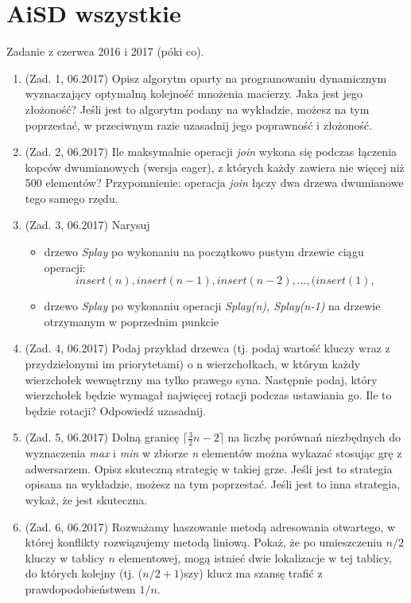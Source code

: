 \documentclass[10pt]{article}%
\begin{document}
\section*{AiSD wszystkie}
Zadanie z czerwca 2016 i 2017 (póki co).
\begin{enumerate}

\item (Zad. 1, 06.2017) Opisz algorytm oparty na programowaniu dynamicznym wyznaczający optymalną kolejność mnożenia macierzy. Jaka jest jego złożoność? Jeśli jest to algorytm podany na wykładzie, możesz na tym poprzestać, w przeciwnym razie uzasadnij jego poprawność i złożoność.

\item (Zad. 2, 06.2017) Ile maksymalnie operacji \textit{join} wykona się podczas łączenia kopców dwumianowych (wersja eager), z których każdy zawiera nie więcej niż 500 elementów? Przypomnienie: operacja \textit{join} łączy dwa drzewa dwumianowe tego samego rzędu.

\item (Zad. 3, 06.2017) Narysuj 
\begin{itemize}
\item drzewo \emph{Splay} po wykonaniu na początkowo pustym drzewie ciągu operacji:
 $$insert(n),insert(n-1),insert(n-2),...,(insert(1),$$
 \item drzewo \emph{Splay} po wykonaniu operacji \emph{Splay(n), Splay(n-1)} na drzewie otrzymanym w poprzednim punkcie
 \end{itemize}

\item (Zad. 4, 06.2017) Podaj przykład drzewca (tj. podaj wartość kluczy wraz z przydzielonymi im priorytetami) o n wierzchołkach, w którym każdy wierzchołek wewnętrzny ma tylko prawego syna. Następnie podaj, który wierzchołek będzie wymagał najwięcej rotacji podczas ustawiania go. Ile to będzie rotacji? Odpowiedź uzasadnij.

\item (Zad. 5, 06.2017) Dolną granicę $\lceil \frac{3}{2} n - 2 \rceil $ na liczbę porównań niezbędnych do wyznaczenia \emph{max} i \emph{min} w zbiorze \emph{n} elementów można wykazać stosując grę z adwersarzem. Opisz skuteczną strategię w takiej grze. Jeśli jest to strategia opisana na wykładzie, możesz na tym poprzestać. Jeśli jest to inna strategia, wykaż, że jest skuteczna.

\item (Zad. 6, 06.2017) Rozważamy haszowanie metodą adresowania otwartego, w której konflikty rozwiązujemy metodą liniową. Pokaż, że po umieszczeniu $n/2$ kluczy w tablicy $n$ elementowej, mogą istnieć dwie lokalizacje w tej tablicy, do których kolejny (tj. ($n/2 + 1$)szy) klucz ma szansę trafić z prawdopodobieństwem $1/n$.


\end{enumerate}
\end{document}

